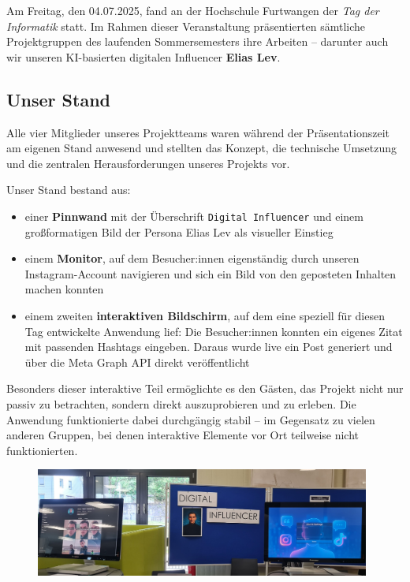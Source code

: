 \documentclass[a4paper,12pt]{article}
\begin{document}
Am Freitag, den 04.07.2025, fand an der Hochschule Furtwangen der \textit{Tag der Informatik} statt. Im Rahmen dieser Veranstaltung präsentierten sämtliche Projektgruppen des laufenden Sommersemesters ihre Arbeiten – darunter auch wir unseren KI-basierten digitalen Influencer \textbf{Elias Lev}.

\subsection{Unser Stand}

Alle vier Mitglieder unseres Projektteams waren während der Präsentationszeit am eigenen Stand anwesend und stellten das Konzept, die technische Umsetzung und die zentralen Herausforderungen unseres Projekts vor.

Unser Stand bestand aus:

\begin{itemize}
    \item einer \textbf{Pinnwand} mit der Überschrift \texttt{Digital Influencer} und einem großformatigen Bild der Persona Elias Lev als visueller Einstieg
    \item einem \textbf{Monitor}, auf dem Besucher:innen eigenständig durch unseren Instagram-Account navigieren und sich ein Bild von den geposteten Inhalten machen konnten
    \item einem zweiten \textbf{interaktiven Bildschirm}, auf dem eine speziell für diesen Tag entwickelte Anwendung lief: Die Besucher:innen konnten ein eigenes Zitat mit passenden Hashtags eingeben. Daraus wurde live ein Post generiert und über die Meta Graph API direkt veröffentlicht
\end{itemize}

Besonders dieser interaktive Teil ermöglichte es den Gästen, das Projekt nicht nur passiv zu betrachten, sondern direkt auszuprobieren und zu erleben. Die Anwendung funktionierte dabei durchgängig stabil – im Gegensatz zu vielen anderen Gruppen, bei denen interaktive Elemente vor Ort teilweise nicht funktionierten.

\begin{figure}[h] %
  \centering
  \includegraphics[width=0.98\textwidth]{images/220250704_110638.jpg}
\end{figure}
\end{document}
